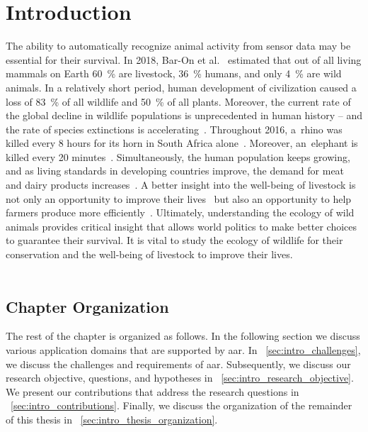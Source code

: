 \section{Introduction}
\label{sec:intro_introduction}

The ability to automatically recognize animal activity from sensor data may be essential for their survival.
In 2018, Bar-On et al.~\cite{BarOn2018} estimated that out of all living mammals on Earth \SI{60}{\%} are livestock, \SI{36}{\%} humans, and only  \SI{4}{\%} are wild animals.
In a relatively short period, human development of civilization caused a loss of \SI{83}{\%} of all wildlife and \SI{50}{\%} of all plants.
Moreover, the current rate of the global decline in wildlife populations is unprecedented in human history -- and the rate of species extinctions is accelerating~\cite{Diaz2019}. 
Throughout 2016, a~rhino was killed every 8 hours for its horn in South Africa alone~\cite{PoachingStat}.
Moreover, an~elephant is killed every 20 minutes~\cite{Wittemyer2014}.
Simultaneously, the human population keeps growing, and as living standards in developing countries improve, the demand for meat and dairy products increases~\cite{Gandhi2010}.
A better insight into the well-being of livestock is not only an opportunity to improve their lives~\cite{Mench1998} but also an opportunity to help farmers produce more efficiently~\cite{Lokhorst2018}.
Ultimately, understanding the ecology of wild animals provides critical insight that allows world politics to make better choices to guarantee their survival.
It is vital to study the ecology of wildlife for their conservation and the well-being of livestock to improve their lives.\\\\


\subsection{Chapter Organization}

The rest of the chapter is organized as follows.
In the following section we discuss various application domains that are supported by \gls{aar}.
In \sectionname~\ref{sec:intro_challenges}, we discuss the challenges and requirements of \gls{aar}.
Subsequently, we discuss our research objective, questions, and hypotheses in \sectionname~\ref{sec:intro_research_objective}.
We present our contributions that address the research questions in \sectionname~\ref{sec:intro_contributions}.
Finally, we discuss the organization of the remainder of this thesis in \sectionname~\ref{sec:intro_thesis_organization}.